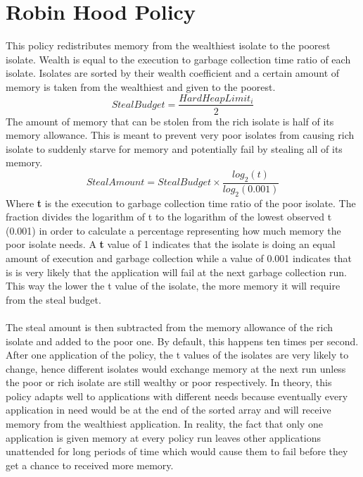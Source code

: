 \documentclass{l4proj}
\begin{document}
\section{Robin Hood Policy}
This policy redistributes memory from the wealthiest isolate to the poorest isolate. Wealth is equal to the execution to garbage collection time ratio of each isolate. Isolates are sorted by their wealth coefficient and a certain amount of memory is taken from the wealthiest and given to the poorest.
\begin{equation}
\textit{StealBudget} = \dfrac{HardHeapLimit_i}{2}
\end{equation}
The amount of memory that can be stolen from the rich isolate is half of its memory allowance. This is meant to prevent very poor isolates from causing rich isolate to suddenly starve for memory and potentially fail by stealing all of its memory.
\begin{equation}
\textit{StealAmount} = StealBudget \times \dfrac{log_2\left(t\right)}{log_2\left(0.001\right)}
\end{equation}
Where \textbf{t} is the execution to garbage collection time ratio of the poor isolate. The fraction divides the logarithm of t to the logarithm of the lowest observed t (0.001) in order to calculate a percentage representing how much memory the poor isolate needs. A \textbf{t} value of 1 indicates that the isolate is doing an equal amount of execution and garbage collection while a value of 0.001 indicates that is is very likely that the application will fail at the next garbage collection run. This way the lower the t value of the isolate, the more memory it will require from the steal budget.
\\\\
The steal amount is then subtracted from the memory allowance of the rich isolate and added to the poor one. By default, this happens ten times per second. After one application of the policy, the t values of the isolates are very likely to change, hence different isolates would exchange memory at the next run unless the poor or rich isolate are still wealthy or poor respectively. In theory, this policy adapts well to applications with different needs because eventually every application in need would be at the end of the sorted array and will receive memory from the wealthiest application. In reality, the fact that only one application is given memory at every policy run leaves other applications unattended for long periods of time which would cause them to fail before they get a chance to received more memory.
\end{document}
